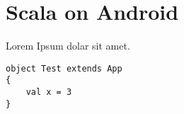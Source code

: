 \section{Scala on Android}

Lorem Ipsum dolar sit amet.

\begin{verbatim}
object Test extends App
{
	val x = 3
}
\end{verbatim}